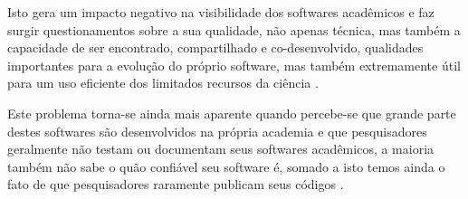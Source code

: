 %

Isto gera um impacto negativo na visibilidade dos softwares acadêmicos e faz
surgir questionamentos sobre a sua qualidade, não apenas técnica, mas também a
capacidade de ser encontrado, compartilhado e co-desenvolvido, qualidades
importantes para a evolução do próprio software, mas também extremamente útil
para um uso eficiente dos limitados recursos da ciência \cite{howison2013,
katz2014transitive}.

Este problema torna-se ainda mais aparente quando percebe-se que grande parte
destes softwares são desenvolvidos na própria academia
\cite{hettrick_2014_14809} e que pesquisadores geralmente não testam ou
documentam seus softwares acadêmicos, a maioria também não sabe o quão
confiável seu software é, somado a isto temos ainda o fato de que pesquisadores
raramente publicam seus códigos \cite{robles2010replicating,
amann2015software}.



